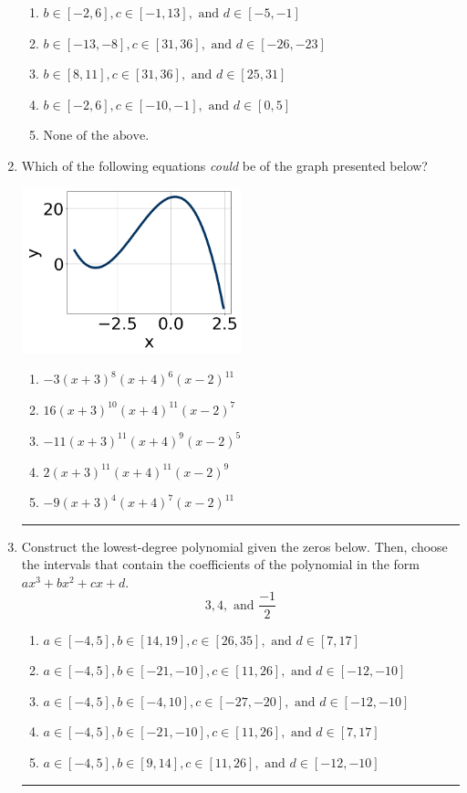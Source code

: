 \documentclass[14pt]{extbook}
\newcommand{\litem}[1]{\item#1\hspace*{-1cm}\rule{\textwidth}{0.4pt}}
\begin{document}
\begin{enumerate}
{\begin{enumerate}[label=\Alph*.]
\item \( b \in [-2, 6], c \in [-1, 13], \text{ and } d \in [-5, -1] \)
\item \( b \in [-13, -8], c \in [31, 36], \text{ and } d \in [-26, -23] \)
\item \( b \in [8, 11], c \in [31, 36], \text{ and } d \in [25, 31] \)
\item \( b \in [-2, 6], c \in [-10, -1], \text{ and } d \in [0, 5] \)
\item \( \text{None of the above.} \)

\end{enumerate} }
\litem{
Which of the following equations \textit{could} be of the graph presented below?
\begin{center}
    \includegraphics[width=0.5\textwidth]{../Figures/polyGraphToFunctionCopyB.png}
\end{center}
\begin{enumerate}[label=\Alph*.]
\item \( -3(x + 3)^{8} (x + 4)^{6} (x - 2)^{11} \)
\item \( 16(x + 3)^{10} (x + 4)^{11} (x - 2)^{7} \)
\item \( -11(x + 3)^{11} (x + 4)^{9} (x - 2)^{5} \)
\item \( 2(x + 3)^{11} (x + 4)^{11} (x - 2)^{9} \)
\item \( -9(x + 3)^{4} (x + 4)^{7} (x - 2)^{11} \)

\end{enumerate} }
\litem{
Construct the lowest-degree polynomial given the zeros below. Then, choose the intervals that contain the coefficients of the polynomial in the form $ax^3+bx^2+cx+d$.\[ 3, 4, \text{ and } \frac{-1}{2} \]\begin{enumerate}[label=\Alph*.]
\item \( a \in [-4, 5], b \in [14, 19], c \in [26, 35], \text{ and } d \in [7, 17] \)
\item \( a \in [-4, 5], b \in [-21, -10], c \in [11, 26], \text{ and } d \in [-12, -10] \)
\item \( a \in [-4, 5], b \in [-4, 10], c \in [-27, -20], \text{ and } d \in [-12, -10] \)
\item \( a \in [-4, 5], b \in [-21, -10], c \in [11, 26], \text{ and } d \in [7, 17] \)
\item \( a \in [-4, 5], b \in [9, 14], c \in [11, 26], \text{ and } d \in [-12, -10] \)

\end{enumerate} }
\end{enumerate}
\end{document}
